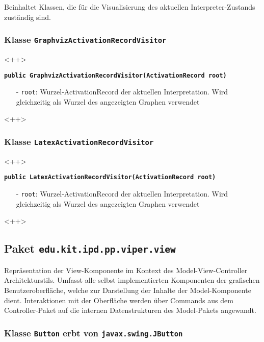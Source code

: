 \documentclass[parskip=full,11pt,twoside]{scrartcl}
\begin{document}
Beinhaltet Klassen, die für die Visualisierung des aktuellen Interpreter-Zustands zuständig sind.

\subsubsection{Klasse \texttt{GraphvizActivationRecordVisitor}}

<++>

\textbf{\texttt{public GraphvizActivationRecordVisitor(ActivationRecord root)}}
\begin{itemize}[noitemsep]
	\item[-] \texttt{root}: Wurzel-ActivationRecord der aktuellen Interpretation. Wird gleichzeitig als Wurzel des angezeigten Graphen verwendet
\end{itemize}
<++>

\subsubsection{Klasse \texttt{LatexActivationRecordVisitor}}

<++>

\textbf{\texttt{public LatexActivationRecordVisitor(ActivationRecord root)}}
\begin{itemize}[noitemsep]
	\item[-] \texttt{root}: Wurzel-ActivationRecord der aktuellen Interpretation. Wird gleichzeitig als Wurzel des angezeigten Graphen verwendet
\end{itemize}
<++>

\subsection{Paket \texttt{edu.kit.ipd.pp.viper.view}}

Repräsentation der View-Komponente im Kontext des Model-View-Controller Architekturstils. Umfasst alle selbst implementierten Komponenten der grafischen Benutzeroberfläche, welche zur Darstellung der Inhalte der Model-Komponente dient. Interaktionen mit der Oberfläche werden über Commands aus dem Controller-Paket auf die internen Datenstrukturen des Model-Pakets angewandt.

\subsubsection{Klasse \texttt{Button} erbt von \texttt{javax.swing.JButton}}
\end{document}
